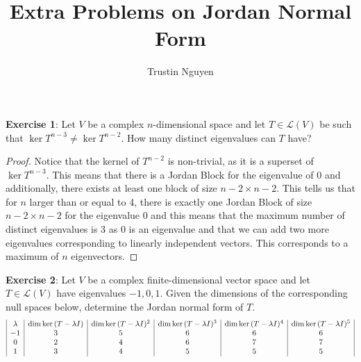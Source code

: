 \documentclass{article}
\title{Extra Problems on Jordan Normal Form}
\author{Trustin Nguyen}
\begin{document}
\maketitle
\reversemarginpar

\textbf{Exercise 1}: Let $V$ be a complex $n$-dimensional space and let $T \in \mathcal{L}(V)$ be such that $\ker{T^{n - 3}} \neq \ker{T^{n - 2}}$. How many distinct eigenvalues can $T$ have?
    \begin{proof}
        Notice that the kernel of $T^{n - 2}$ is non-trivial, as it is a superset of $\ker{T^{n - 3}}$. This means that there is a Jordan Block for the eigenvalue of 0 and additionally, there exists at least one block of size $n - 2 \times n - 2$. This tells us that for $n$ larger than or equal to 4, there is exactly one Jordan Block of size $n - 2 \times n - 2$ for the eigenvalue 0 and this means that the maximum number of distinct eigenvalues is 3 as 0 is an eigenvalue and that we can add two more eigenvalues corresponding to linearly independent vectors. This corresponds to a maximum of $n$ eigenvectors.  
    \end{proof}
\textbf{Exercise 2}: Let $V$ be a complex finite-dimensional vector space and let $T \in \mathcal{L}(V)$ have eigenvalues $-1, 0, 1$. Given the dimensions of the corresponding null spaces below, determine the Jordan normal form of $T$.
\begin{align*}
    \begin{array}{ | c | c | c | c | c | c | }
        \lambda & \dim{\ker{(T - \lambda I)}} & \dim{\ker{(T - \lambda I)^{2}}} & \dim{\ker{(T - \lambda I)^{3}}} & \dim{\ker{(T - \lambda I)^{4}}} & \dim{\ker{(T - \lambda I)^{5}}} \\
        -1      & 3                          & 5                               & 6                               & 6                               & 6                               \\
        0       & 2                          & 4                               & 6                               & 7                               & 7                               \\
        1       & 3                          & 4                               & 5                               & 5                               & 5                               \\
    \end{array}
\end{align*}
\end{document}
